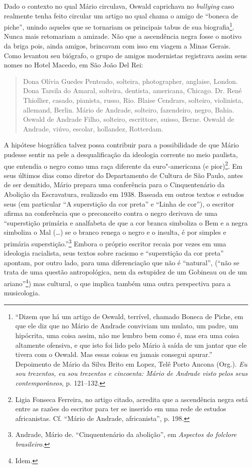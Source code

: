 Dado o contexto no qual Mário circulava, Oswald caprichava no
\emph{bullying} caso realmente tenha feito circular um artigo no qual
chama o amigo de ``boneca de piche'', unindo aqueles que se tornariam os
principais tabus de sua biografia\footnote{``Dizem que há um artigo de
  Oswald, terrível, chamado Boneca de Piche, em que ele diz que no Mário
  de Andrade conviviam um mulato, um padre, um hipócrita, uma coisa
  assim, não me lembro bem como é, mas era uma coisa altamente ofensiva,
  e que isto foi lido pelo Mário à saída de um jantar que ele tivera com
  o Oswald. Mas essas coisas eu jamais consegui apurar.'' Depoimento de
  Mário da Silva Brito em Lopez, Telê Porto Ancona (Org.). \emph{Eu sou
  trezentos, eu sou trezentos e cincoenta: Mário de Andrade visto pelos
  seus contemporâneos}, p. 121--132.}. Nunca mais retomariam a amizade.
Não que a ascendência negra fosse o motivo da briga pois, ainda amigos,
brincavam com isso em viagem a Minas Gerais. Como levantou seu biógrafo,
o grupo de amigos modernistas registrava assim seus nomes no Hotel
Macedo, em São João Del Rei:

\begin{quote}
Dona Olívia Guedes Penteado, solteira, photographer, anglaise, London.
Dona Tarsila do Amaral, solteira, dentista, americana, Chicago. Dr. René
Thiollier, casado, pianista, russo, Rio. Blaise Cendrars, solteiro,
violinista, allemand, Berlin. Mário de Andrade, solteiro, fazendeiro,
negro, Bahia. Oswald de Andrade Filho, solteiro, escrittore, suisso,
Berne. Oswald de Andrade, viúvo, escolar, hollandez, Rotterdam.
\end{quote}

A hipótese biográfica talvez possa contribuir para a possibilidade de
que Mário pudesse sentir na pele a desqualificação da ideologia corrente
no meio paulista, que entendia o negro como uma raça diferente da
euro"-americana (e pior)\footnote{Ligia Fonseca Ferreira, no artigo
  citado, acredita que a ascendência negra está entre as razões do
  escritor para ter se inserido em uma rede de estudos africanistas. Cf.
  ``Mário de Andrade, africanista'', p. 198.}. Em seus últimos dias como
diretor do Departamento de Cultura de São Paulo, antes de ser demitido,
Mário prepara uma conferência para o Cinquentenário da Abolição da
Escravatura, realizado em 1938. Baseada em outros textos e estudos seus
(em particular ``A superstição da cor preta'' e ``Linha de cor''), o
escritor afirma na conferência que o preconceito contra o negro derivava
de uma ``superstição primária e analfabeta de que a cor branca simboliza
o Bem e a negra simboliza o Mal (\ldots{}) se o branco renega o negro e o
insulta, é por simples e primária superstição.''\footnote{Andrade, Mário
  de. ``Cinquentenário da abolição'', em \emph{Aspectos do folclore
  brasileiro}.} Embora o próprio escritor recaia por vezes em uma
ideologia racialista, seus textos sobre racismo e ``superstição da cor
preta'' apontam, por outro lado, para uma diferenciação que não é
``natural'', (``não se trata de uma questão antropológica, nem da
estupidez de um Gobineau ou de um ariano''\footnote{Idem.}) mas
cultural, o que implica também uma outra perspectiva para a musicologia.


